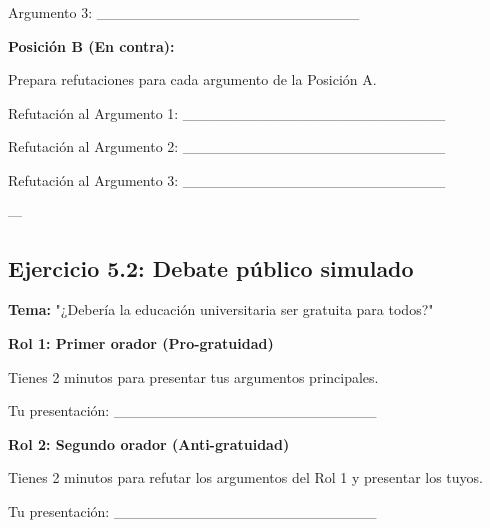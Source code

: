 \documentclass[a4paper,11pt]{article}
\begin{document}
Argumento 3: _________________________

\vspace{0.2cm}

\textbf{Posición B (En contra):}

Prepara refutaciones para cada argumento de la Posición A.

\vspace{0.2cm}

Refutación al Argumento 1: _________________________

\vspace{0.2cm}

Refutación al Argumento 2: _________________________

\vspace{0.2cm}

Refutación al Argumento 3: _________________________

\vspace{0.2cm}

---

\vspace{0.2cm}

\subsection{Ejercicio 5.2: Debate público simulado}

\vspace{0.2cm}

\textbf{Tema:} "¿Debería la educación universitaria ser gratuita para todos?"

\vspace{0.2cm}

\textbf{Rol 1: Primer orador (Pro-gratuidad)}

Tienes 2 minutos para presentar tus argumentos principales.

\vspace{0.2cm}

Tu presentación: _________________________

\vspace{0.2cm}

\textbf{Rol 2: Segundo orador (Anti-gratuidad)}

Tienes 2 minutos para refutar los argumentos del Rol 1 y presentar los tuyos.

\vspace{0.2cm}

Tu presentación: _________________________

\vspace{0.2cm}
\end{document}
